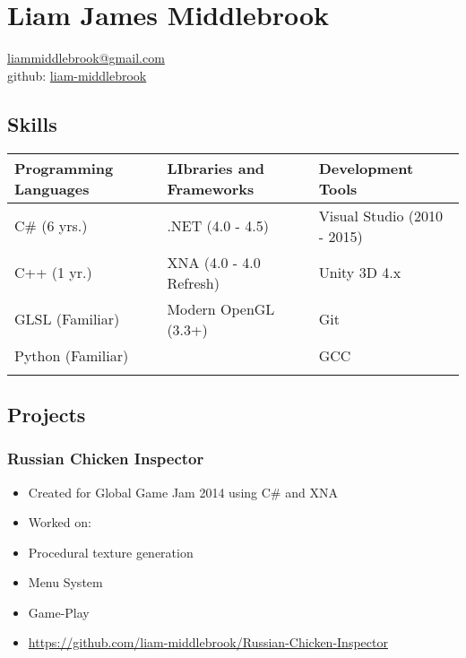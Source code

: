 \documentclass[a4paper,12pt]{article}
\begin{document}
\section{Liam James Middlebrook}\label{liam-james-middlebrook}

\href{mailto:liammiddlebrook@gmail.com}{liammiddlebrook@gmail.com}\\
github: \href{https://github.com/liam-middlebrook}{liam-middlebrook}

\subsection{Skills}\label{skills}

\begin{table}[h]
\begin{tabular}{@{}lll@{}}
\toprule
Programming Languages & LIbraries and Frameworks & Development Tools           \\ \midrule
C\# (6 yrs.)          & .NET (4.0 - 4.5)         & Visual Studio (2010 - 2015) \\
C++ (1 yr.)           & XNA (4.0 - 4.0 Refresh)  & Unity 3D 4.x                \\
GLSL (Familiar)       & Modern OpenGL (3.3+)     & Git                         \\
Python (Familiar)     &                          & GCC                         \\
                      &                          &                             \\ \bottomrule
\end{tabular}
\end{table}

\subsection{Projects}\label{projects}

\subsubsection{Russian Chicken
Inspector}\label{russian-chicken-inspector}

\begin{itemize}
\itemsep1pt\parskip0pt
\item
  Created for Global Game Jam 2014 using C\# and XNA
\item
  Worked on:
\item
  Procedural texture generation
\item
  Menu System
\item
  Game-Play
\item
  \url{https://github.com/liam-middlebrook/Russian-Chicken-Inspector}
\end{itemize}
\end{document}
